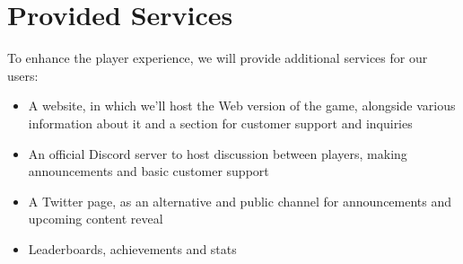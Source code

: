 \section{Provided Services}

To enhance the player experience, we will provide additional services for our users:

\begin{itemize}
	\item A website, in which we'll host the Web version of the game, alongside various information about it and a section for customer support and inquiries
	\item An official Discord server to host discussion between players, making announcements and basic customer support
	\item A Twitter page, as an alternative and public channel for announcements and upcoming content reveal
	\item Leaderboards, achievements and stats
\end{itemize}
